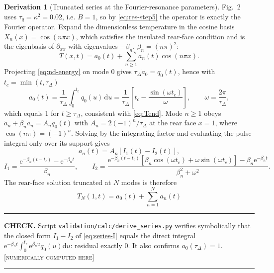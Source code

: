 \documentclass[11pt,a4paper]{article}
\theoremstyle{definition}
\newtheorem{derivationx}{Derivation}[section]
\newenvironment{checkbox}%
  {\par\medskip\noindent\begin{minipage}{\linewidth}%
   \rule{\linewidth}{0.4pt}\par\noindent\textbf{CHECK.}\enspace}%
  {\par\rule{\linewidth}{0.4pt}\end{minipage}\par\medskip}
\newcommand{\NUM}{\textcolor{red!55!black}{\footnotesize[\textsc{numerically computed here}]}}
\newcommand{\tq}{\tau_{q}}
\newcommand{\kk}{\kappa^{2}}
\newcommand{\Bnum}{B}
\begin{document}
\begin{derivationx}[Truncated series at the Fourier-resonance parameters]
\label{der:series}
Fig.~2 uses $\tq=\kk=0.02$, i.e. $\Bnum=1$, so by \eqref{eq:res-step5} the
operator is exactly the Fourier operator. Expand the dimensionless temperature
in the cosine basis $X_{n}(x)=\cos(n\pi x)$, which satisfies the insulated
rear-face condition and is the eigenbasis of $\partial_{xx}$ with eigenvalues
$-\beta_{n}$, $\beta_{n}=(n\pi)^{2}$:
\begin{equation}
  T(x,t)=a_{0}(t)+\sum_{n\geq1}a_{n}(t)\cos(n\pi x) .
  \label{eq:series-expansion}
\end{equation}
Projecting \eqref{eq:nd-energy} on mode $0$ gives
$\tau_{\Delta}\dot a_{0}=q_{0}(t)$, hence with $t_{c}=\min(t,\tau_{\Delta})$
\begin{equation}
  a_{0}(t)=\frac{1}{\tau_{\Delta}}\int_{0}^{t_{c}}q_{0}(u)\,\mathrm{d}u
          =\frac{1}{\tau_{\Delta}}
           \left[t_{c}-\frac{\sin(\omega t_{c})}{\omega}\right],
  \qquad \omega=\frac{2\pi}{\tau_{\Delta}} ,
  \label{eq:series-a0}
\end{equation}
which equals $1$ for $t\geq\tau_{\Delta}$, consistent with \eqref{eq:Tend}.
Mode $n\geq1$ obeys $\dot a_{n}+\beta_{n}a_{n}=A_{n}q_{0}(t)$ with
$A_{n}=2(-1)^{n}/\tau_{\Delta}$ at the rear face $x=1$, where
$\cos(n\pi)=(-1)^{n}$. Solving by the integrating factor and evaluating the
pulse integral only over its support gives
\begin{equation}
  a_{n}(t)=A_{n}\left[I_{1}(t)-I_{2}(t)\right],
  \label{eq:series-an}
\end{equation}
\begin{equation}
  I_{1}=\frac{\mathrm{e}^{-\beta_{n}(t-t_{c})}-\mathrm{e}^{-\beta_{n}t}}
             {\beta_{n}},
  \qquad
  I_{2}=\frac{\mathrm{e}^{-\beta_{n}(t-t_{c})}
              \left[\beta_{n}\cos(\omega t_{c})+\omega\sin(\omega t_{c})\right]
              -\beta_{n}\mathrm{e}^{-\beta_{n}t}}
             {\beta_{n}^{2}+\omega^{2}} .
  \label{eq:series-I}
\end{equation}
The rear-face solution truncated at $N$ modes is therefore
\begin{equation}
  \boxed{\ T_{N}(1,t)=a_{0}(t)+\sum_{n=1}^{N}a_{n}(t)\ }
  \label{eq:series-TN}
\end{equation}
\end{derivationx}

\begin{checkbox}
Script \texttt{validation/calc/derive\_series.py} verifies symbolically that
the closed form $I_{1}-I_{2}$ of \eqref{eq:series-I} equals the direct integral
$\mathrm{e}^{-\beta_{n}t}\int_{0}^{t_{c}}\mathrm{e}^{\beta_{n}u}q_{0}(u)
\mathrm{d}u$: residual exactly $0$. It also confirms
$a_{0}(\tau_{\Delta})=1$. \NUM
\end{checkbox}
\end{document}

